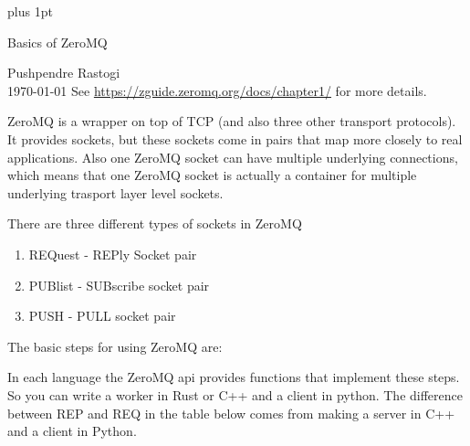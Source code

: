 \documentclass[preview,border={30 30 30 30}]{standalone}
\begin{document}
\parskip=5pt plus 1pt
\begin{center}
    \Large Basics of ZeroMQ
\end{center}
Pushpendre Rastogi\\
\today
See \url{https://zguide.zeromq.org/docs/chapter1/} for more details.

ZeroMQ is a wrapper on top of TCP (and also three other transport protocols). It provides sockets, but these sockets come in pairs that map more closely to real applications. Also one ZeroMQ socket can have multiple underlying connections, which means that one ZeroMQ socket is actually a container for multiple underlying trasport layer level sockets.

There are three different types of sockets in ZeroMQ
\begin{enumerate}
    \item REQuest - REPly Socket pair
    \item PUBlist - SUBscribe socket pair
    \item PUSH - PULL socket pair
\end{enumerate}

The basic steps for using ZeroMQ are:

In each language the ZeroMQ api provides functions that implement these steps. So you can write a worker in Rust or C++ and a client in python. The difference between REP and REQ in the table below comes from making a server in C++ and a client in Python. 
\end{document}
